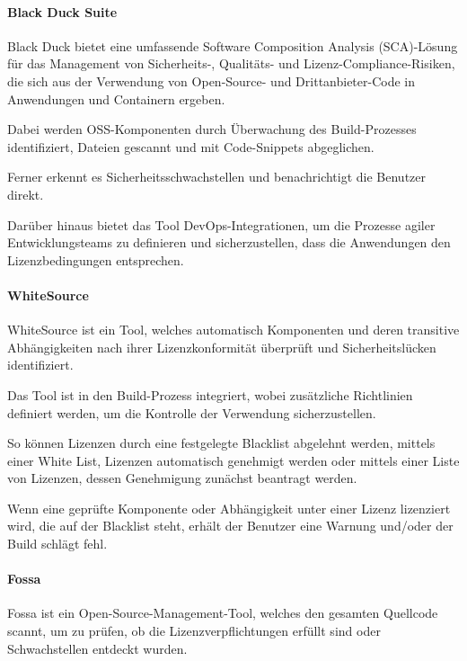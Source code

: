 \paragraph{Black Duck Suite}

Black Duck bietet eine umfassende Software Composition Analysis (SCA)-Lösung für das Management von Sicherheits-, Qualitäts- und Lizenz-Compliance-Risiken, die sich aus der Verwendung von Open-Source- und Drittanbieter-Code in Anwendungen und Containern ergeben. \cite{synopsys_black_2021}

Dabei werden OSS-Komponenten durch Überwachung des Build-Prozesses identifiziert, Dateien gescannt und mit Code-Snippets abgeglichen. 

Ferner erkennt es Sicherheitsschwachstellen und benachrichtigt die Benutzer direkt. 

Darüber hinaus bietet das Tool DevOps-Integrationen, um die Prozesse agiler Entwicklungsteams zu definieren und sicherzustellen, dass die Anwendungen den Lizenzbedingungen entsprechen.

\paragraph{WhiteSource}

WhiteSource ist ein Tool, welches automatisch Komponenten und deren transitive Abhängigkeiten nach ihrer Lizenzkonformität überprüft und Sicherheitslücken identifiziert. \cite{whitesource_software_whitesource_2021}  

Das Tool ist in den Build-Prozess integriert, wobei zusätzliche Richtlinien definiert werden, um die Kontrolle der Verwendung sicherzustellen. 

So können Lizenzen durch eine festgelegte Blacklist abgelehnt werden, mittels einer White List, Lizenzen automatisch genehmigt werden oder mittels einer Liste von Lizenzen, dessen Genehmigung zunächst beantragt werden. 

Wenn eine geprüfte Komponente oder Abhängigkeit unter einer Lizenz lizenziert wird, die auf der Blacklist steht, erhält der Benutzer eine Warnung und/oder der Build schlägt fehl.

\paragraph{Fossa}

Fossa ist ein Open-Source-Management-Tool, welches den gesamten Quellcode scannt, um zu prüfen, ob die Lizenzverpflichtungen erfüllt sind oder Schwachstellen entdeckt wurden. \cite{fossa_fossa_2021} 

